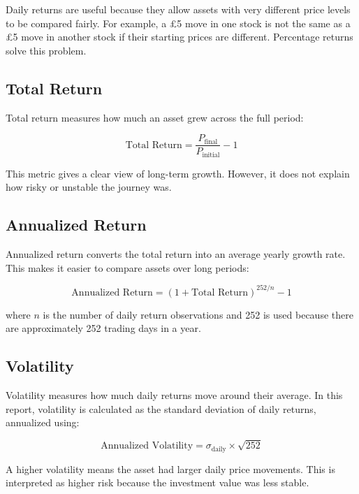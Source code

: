 \documentclass[12pt,a4paper]{article}
\begin{document}
Daily returns are useful because they allow assets with very different price levels to be compared fairly. For example, a \pounds 5 move in one stock is not the same as a \pounds 5 move in another stock if their starting prices are different. Percentage returns solve this problem.

\subsection{Total Return}

Total return measures how much an asset grew across the full period:

\begin{equation}
    \text{Total Return} = \frac{P_{\text{final}}}{P_{\text{initial}}} - 1
\end{equation}

This metric gives a clear view of long-term growth. However, it does not explain how risky or unstable the journey was.

\subsection{Annualized Return}

Annualized return converts the total return into an average yearly growth rate. This makes it easier to compare assets over long periods:

\begin{equation}
    \text{Annualized Return} = (1 + \text{Total Return})^{252/n} - 1
\end{equation}

where \(n\) is the number of daily return observations and 252 is used because there are approximately 252 trading days in a year.

\subsection{Volatility}

Volatility measures how much daily returns move around their average. In this report, volatility is calculated as the standard deviation of daily returns, annualized using:

\begin{equation}
    \text{Annualized Volatility} = \sigma_{\text{daily}} \times \sqrt{252}
\end{equation}

A higher volatility means the asset had larger daily price movements. This is interpreted as higher risk because the investment value was less stable.
\end{document}

